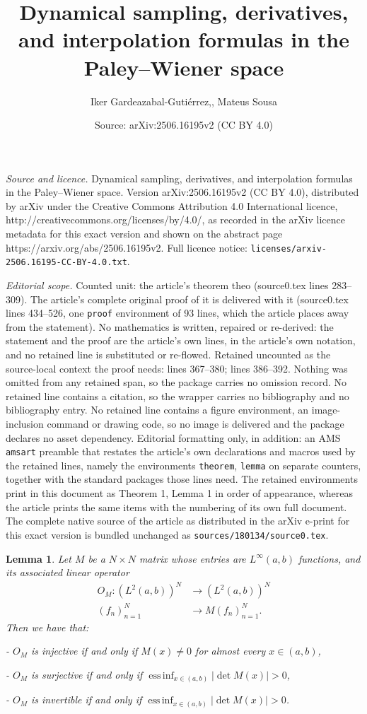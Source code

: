 \documentclass[10pt,a4paper]{amsart}
\title{Dynamical sampling, derivatives, and interpolation formulas in the Paley--Wiener space}
\author{Iker Gardeazabal-Guti\'errez,, Mateus Sousa}
\date{Source: arXiv:2506.16195v2 (CC BY 4.0)}
\newtheorem{lemma}{Lemma}
\newcommand{\abs}[1]{\left\vert#1\right\vert}
\DeclareMathOperator{\essinf}{ess\,inf}
\newcommand{\pa}[1]{\left(#1\right)}
\begin{document}
\maketitle

\noindent\emph{Source and licence.} Dynamical sampling, derivatives, and interpolation formulas in the Paley--Wiener space. Version arXiv:2506.16195v2 (CC BY 4.0), distributed by arXiv under the Creative Commons Attribution 4.0 International licence, http://creativecommons.org/licenses/by/4.0/, as recorded in the arXiv licence metadata for this exact version and shown on the abstract page https://arxiv.org/abs/2506.16195v2. Full licence notice: \texttt{licenses/arxiv-2506.16195-CC-BY-4.0.txt}.\par\smallskip

\noindent\textit{Editorial scope.} Counted unit: the article's theorem theo (source0.tex lines 283--309). The article's complete original proof of it is delivered with it (source0.tex lines 434--526, one \texttt{proof} environment of 93 lines, which the article places away from the statement). No mathematics is written, repaired or re-derived: the statement and the proof are the article's own lines, in the article's own notation, and no retained line is substituted or re-flowed.  Retained uncounted as the source-local context the proof needs: lines 367--380; lines 386--392.  Nothing was omitted from any retained span, so the package carries no omission record.  No retained line contains a citation, so the wrapper carries no bibliography and no bibliography entry.  No retained line contains a figure environment, an image-inclusion command or drawing code, so no image is delivered and the package declares no asset dependency.  Editorial formatting only, in addition: an AMS \texttt{amsart} preamble that restates the article's own declarations and macros used by the retained lines, namely the environments \texttt{theorem}, \texttt{lemma} on separate counters, together with the standard packages those lines need.  The retained environments print in this document as Theorem 1, Lemma 1 in order of appearance, whereas the article prints the same items with the numbering of its own full document.  The complete native source of the article as distributed in the arXiv e-print for this exact version is bundled unchanged as \texttt{sources/180134/source0.tex}.
\begin{lemma}\label{lem1}
	Let $M$ be a $N\times N$ matrix whose entries are $L^\infty(a,b)$ functions, and its associated linear operator
	\begin{align*}
		O_M: \pa{L^2(a,b)}^N &\to \pa{L^2(a,b)}^N \\
		(f_n)_{n=1}^N &\to M (f_n)_{n=1}^N.
	\end{align*}
	Then we have that: 
	
	- $O_M$ is injective if and only if $M(x)\neq 0$ for almost every $x\in (a,b)$,
	
	- $O_M$ is surjective if and only if $\essinf_{x\in (a,b)}\abs{\det M(x)}>0$,
	
	- $O_M$ is invertible if and only if $\essinf_{x\in (a,b)}\abs{\det M(x)}>0$.
\end{lemma}
\end{document}
